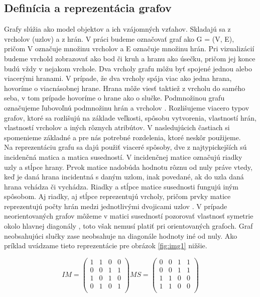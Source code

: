 \subsection{Definícia a reprezentácia grafov}

Grafy slúžia ako model objektov a ich vzájomných vzťahov. Skladajú sa z vrcholov (uzlov) a z hrán. V práci budeme označovať graf ako G = (V, E), pričom V označuje množinu vrcholov a E označuje množinu hrán. Pri vizualizácií budeme vrchold zobrazovať ako bod či kruh a hranu ako úsečku, pričom jej konce budú vždy v nejakom vrchole. Dva vrcholy grafu môžu byť spojené jednou alebo viacerými hranami. V prípade, že dva vrcholy spája viac ako jedna hrana, hovoríme o viacnásobnej hrane. Hrana môže viesť taktiež z vrcholu do samého seba, v tom prípade hovoríme o hrane ako o slučke. Podmnožinou grafu označujeme ľubovoľnú podmnožinu hrán a vrcholov \citep{markovsovadynamika}. Rozlišujeme viacero typov grafov, ktoré sa rozlišujú na základe veľkosti, spôsobu vytvorenia, vlastností hrán, vlastností vrcholov a iných rôznych atribútov. V nasledujúcich častiach si spomenieme základné a pre nás potrebné rozdelenia, ktoré neskôr použijeme. \\

Na reprezentáciu grafu sa dajú použiť viaceré spôsoby, dve z najtypickejších sú incidenčná matica a matica susedností. V incidenčnej matice označujú riadky uzly a stĺpce hrany. Prvok matice nadobúda hodnotu rôznu od nuly práve vtedy, keď je daná hrana incidentná s daným uzlom, inak povedané, ak do uzla daná hrana vchádza či vychádza. Riadky a stĺpce matice susednosti fungujú iným spôsobom. Aj riadky, aj stĺpce reprezentujú vrcholy, pričom prvky matice reprezentujú počty hrán medzi jednotlivými dvojicami uzlov \citep{markovsovadynamika}.  V prípade neorientovaných grafov môžeme v matici susedností pozorovať vlastnosť symetrie okolo hlavnej diagonály \citep{cormen2009introduction}, toto však nemusí platiť pri orientovaných grafoch. Graf neobsahujúci slučky zase neobsahuje na diagonále hodnoty iné od nuly. Ako príklad uvádzame tieto reprezentácie pre obrázok \ref{fig:img1} nižšie.

\[ IM= \left( \begin{array}{cccc}
1 & 1 & 0 & 0\\
0 & 0 & 1 & 1\\
1 & 0 & 1 & 0\\
0 & 1 & 0 & 1\\
\end{array} \right)
%
MS= \left( \begin{array}{cccc}
0 & 0 & 1 & 1 \\
0 & 0 & 1 & 1\\
1 & 1 & 0 & 0\\
1 & 1 & 0 & 0\\
\end{array} \right)
\label{eq:matrices}
\]



